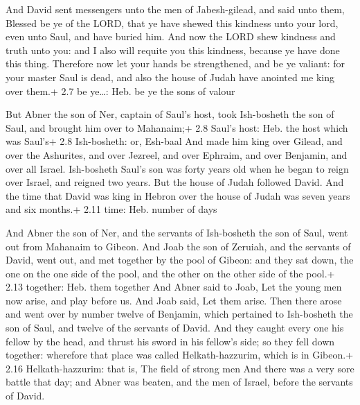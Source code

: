  And David sent messengers unto the men of Jabesh-gilead,
and said unto them, Blessed be ye of the LORD, that ye have shewed this
kindness unto your lord, even unto Saul, and have buried him.
 And now the LORD shew kindness and truth unto you: and I
also will requite you this kindness, because ye have done this thing.
 Therefore now let your hands be strengthened, and be ye
valiant: for your master Saul is dead, and also the house of Judah have
anointed me king over them.+ 2.7 be ye\ldots: Heb. be ye the sons of
valour

 But Abner the son of Ner, captain of Saul's host, took
Ish-bosheth the son of Saul, and brought him over to Mahanaim;+ 2.8
Saul's host: Heb. the host which was Saul's+ 2.8 Ish-bosheth: or,
Esh-baal  And made him king over Gilead, and over the
Ashurites, and over Jezreel, and over Ephraim, and over Benjamin, and
over all Israel.  Ish-bosheth Saul's son was forty years
old when he began to reign over Israel, and reigned two years. But the
house of Judah followed David.  And the time that David was
king in Hebron over the house of Judah was seven years and six months.+
2.11 time: Heb. number of days

 And Abner the son of Ner, and the servants of
Ish-bosheth the son of Saul, went out from Mahanaim to Gibeon.
 And Joab the son of Zeruiah, and the servants of David,
went out, and met together by the pool of Gibeon: and they sat down, the
one on the one side of the pool, and the other on the other side of the
pool.+ 2.13 together: Heb. them together  And Abner said to
Joab, Let the young men now arise, and play before us. And Joab said,
Let them arise.  Then there arose and went over by number
twelve of Benjamin, which pertained to Ish-bosheth the son of Saul, and
twelve of the servants of David.  And they caught every one
his fellow by the head, and thrust his sword in his fellow's side; so
they fell down together: wherefore that place was called
Helkath-hazzurim, which is in Gibeon.+ 2.16 Helkath-hazzurim: that is,
The field of strong men  And there was a very sore battle
that day; and Abner was beaten, and the men of Israel, before the
servants of David.

